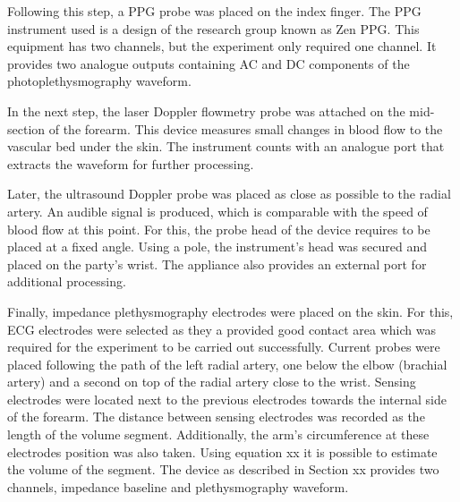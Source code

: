 

Following this step, a PPG probe was placed on the index finger. The PPG instrument used is a design of the research group known as Zen PPG. This equipment has two channels, but the experiment only required one channel. It provides two analogue outputs containing AC and DC components of the photoplethysmography waveform. 


In the next step, the laser Doppler flowmetry probe was attached on the mid-section of the forearm. This device measures small changes in blood flow to the vascular bed under the skin. The instrument counts with an analogue port that extracts the waveform for further processing.  



Later, the ultrasound Doppler probe was placed as close as possible to the radial artery. An audible signal is produced, which is comparable with the speed of blood flow at this point. For this, the probe head of the device requires to be placed at a fixed angle. Using a pole, the instrument's head was secured and placed on the party's wrist. The appliance also provides an external port for additional processing.  



Finally, impedance plethysmography electrodes were placed on the skin. For this, ECG electrodes were selected as they a provided good contact area which was required for the experiment to be carried out successfully. Current probes were placed following the path of the left radial artery, one below the elbow (brachial artery) and a second on top of the radial artery close to the wrist. Sensing electrodes were located next to the previous electrodes towards the internal side of the forearm. The distance between sensing electrodes was recorded as the length of the volume segment. Additionally, the arm's circumference at these electrodes position was also taken. Using equation xx it is possible to estimate the volume of the segment.  The device as described in Section xx provides two channels, impedance baseline and plethysmography waveform. 

